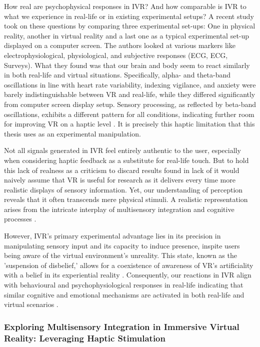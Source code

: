\documentclass[12pt,oneside,openright]{report}
\begin{document}
How real are psychophysical responses in IVR? And how comparable is IVR to what we experience in real-life or in existing experimental setups? A recent study took on these questions by comparing three experimental set-ups: One in physical reality, another in virtual reality and a last one as a typical experimental set-up displayed on a computer screen. The authors looked at various markers like electrophysiological, physiological, and subjective responses (ECG, ECG, Surveys). What they found was that our brain and body seem to react similarly in both real-life and virtual situations. Specifically, alpha- and theta-band oscillations in line with heart rate variability, indexing vigilance, and anxiety were barely indistinguishable between VR and real-life, while they differed significantly from computer screen display setup. Sensory processing, as reflected by beta-band oscillations, exhibits a different pattern for all conditions, indicating further room for improving VR on a haptic level \parencite{Schne2023TheRO}. It is precisely this haptic limitation that this thesis uses as an experimental manipulation. 

Not all signals generated in IVR feel entirely authentic to the user, especially when considering haptic feedback as a substitute for real-life touch. But to hold this lack of realness as a criticism to discard results found in lack of it would naively assume that VR  is useful for research as it delivers every time more realistic displays of sensory information. Yet, our understanding of perception reveals that it often transcends mere physical stimuli. A realistic representation arises from the intricate interplay of multisensory integration and cognitive processes \parencite{deGelder2018VirtualRA}. 

However, IVR's primary experimental advantage lies in its precision in manipulating sensory input and its capacity to induce presence, inspite users being aware of the virtual environment's unreality. This state, known as the 'suspension of disbelief,' allows for a coexistence of awareness of VR's artificiality with a belief in its experiential reality \parencite{Slater2009PlaceIA}. Consequently, our reactions in IVR align with behavioural and psychophysiological responses in real-life indicating that similar cognitive and emotional mechanisms are activated in both real-life and virtual scenarios \parencite{Vasser2020GuidelinesFI, deGelder2018VirtualRA}.

\subsubsection*{Exploring Multisensory Integration in Immersive Virtual Reality: Leveraging Haptic Stimulation}
\end{document}

